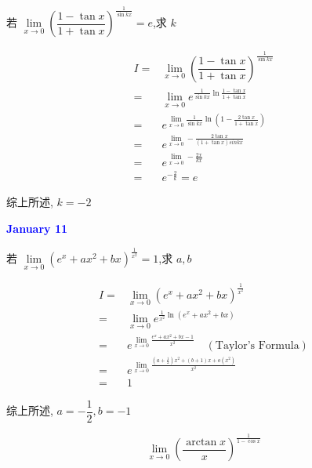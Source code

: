 \begin{example}[][Exam: 27.2.6]
	若 $\lim\limits_{x\to 0}\left(\dfrac{1-\tan x}{1+\tan x}\right)^{\frac{1}{\sin kx}}=e$,求 $k$
\end{example}

\begin{solution}
	
	\begin{align*}
		I = & \lim\limits_{x\to 0}\left(\dfrac{1-\tan x}{1+\tan x} \right)^{\frac{1}{\sin kx}} \\
		  = & \lim\limits_{x\to 0}e^{\frac{1}{\sin kx}\ln\frac{1-\tan x}{1+\tan x}}\\
		  = & e^{\lim\limits_{x\to 0}\frac{1}{\sin kx}\ln(1-\frac{2\tan x}{1+\tan x})}\\
		  = & e^{\lim\limits_{x\to 0}-\frac{2\tan x}{(1+\tan x)sin kx}}\\
		  = & e^{\lim\limits_{x\to 0}-\frac{2x}{kx}}\\
		  = & e^{-\frac{2}{k}} = e
	\end{align*}

	综上所述, $k = -2$
\end{solution}

\textcolor{blue}{\textbf{January 11}}

\begin{example}[][Exam: 27.2.7]
	若 $\lim\limits_{x\to 0}(e^{x}+ax^{2}+bx)^{\frac{1}{x^{2}}}=1$,求 $a,b$
\end{example}

\begin{solution}

	\begin{align*}
		I = & \lim\limits_{x\to 0}(e^{x}+ax^{2}+bx)^{\frac{1}{x^{2}}}\\
		  = & \lim\limits_{x\to 0}e^{\frac{1}{x^{2}}\ln(e^{x}+ax^{2}+bx)}\\
		  = & e^{\lim\limits_{x\to 0}\frac{e^{x}+ax^{2}+bx-1}{x^{2}}}\quad (\text{Taylor's Formula})\\
		  = & e^{\lim\limits_{x\to 0}\frac{(a+\frac{1}{2})x^{2}+(b+1)x+o(x^{2})}{x^{2}}}\\
		  = & 1
	\end{align*}

	综上所述, $a = -\dfrac{1}{2}, b = -1$
\end{solution}

\begin{example}[][Exam: 27.2.8]
	$$\lim\limits_{x\to 0}\left(\dfrac{\arctan x}{x}\right)^{\frac{1}{1-\cos x}}$$
\end{example}

